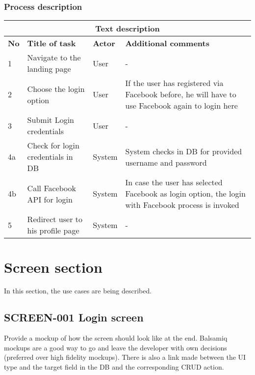 \documentclass{article}
\begin{document}
\subsubsection{Process description}

\begin{table}[h]
\begin{tabularx}{\textwidth}{|l|X|X|X|}
\hline
 \multicolumn{4}{|c|}{\textbf{Text description} } \\
\hline
\hline
\textbf{No} & \textbf{Title of task} & \textbf{Actor} & \textbf{Additional comments}  \\
\hline
1 & Navigate to the landing page & User & - \\
\hline
2 & Choose the login option & User & If the user has registered via Facebook before, he will have to use Facebook again to login here \\
\hline
3 & Submit Login credentials  & User & - \\
\hline
4a & Check for login credentials in DB  &  System & System checks in DB for provided username and password \\
\hline
4b & Call Facebook API for login  &  System & In case the user has selected Facebook as login option, the login with Facebook process is invoked \\
\hline
5 & Redirect user to his profile page &  System & - \\
\hline

\end{tabularx}
\end{table}


\section{Screen section}
In this section, the use cases are being described.

\subsection{SCREEN-001 Login screen}
Provide a mockup of how the screen should look like at the end. Balsamiq mockups are a good way to go and leave the developer with own decisions (preferred over high fidelity mockups).
There is also a link made between the UI type and the target field in the DB and the corresponding CRUD action.
\end{document}

